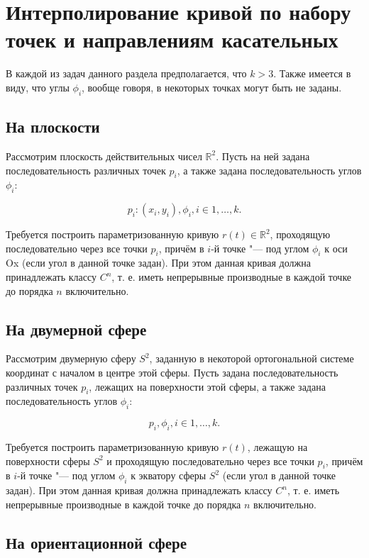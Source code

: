 \section{Интерполирование кривой по набору точек и направлениям касательных}

В каждой из задач данного раздела предполагается, что $k>3$. Также имеется в виду, что углы $\phi_i$, вообще говоря,
в некоторых точках могут быть не заданы.

\subsection*{На плоскости}

Рассмотрим плоскость действительных чисел $\mathbb{R}^2$. Пусть на ней задана последовательность различных точек
$p_i$, а также задана последовательность углов $\phi_i$:

$${p_i: (x_i, y_i)}, {\phi_i}, i \in {1, \dots, k}.$$

Требуется построить параметризованную кривую $r(t) \in \mathbb{R}^2$, проходящую последовательно через все точки
$p_i$, причём в $i$-й точке "--- под углом $\phi_i$ к оси Ox (если угол в данной точке задан). При этом данная кривая
должна принадлежать классу $C^n$, т. е. иметь непрерывные производные в каждой точке до порядка $n$ включительно.

\subsection*{На двумерной сфере}

Рассмотрим двумерную сферу $S^2$, заданную в некоторой ортогональной системе координат с началом в центре этой сферы.
Пусть задана последовательность различных точек $p_i$, лежащих на поверхности этой сферы, а также задана
последовательность углов $\phi_i$:

$${p_i}, {\phi_i}, i \in {1, \dots, k}.$$

Требуется построить параметризованную кривую $r(t)$, лежащую на поверхности сферы $S^2$ и проходящую последовательно
через все точки $p_i$, причём в $i$-й точке "--- под углом $\phi_i$ к экватору сферы $S^2$ (если угол в данной точке
задан). При этом данная кривая должна принадлежать классу $C^n$, т. е. иметь непрерывные производные в каждой точке
до порядка $n$ включительно.

\subsection*{На ориентационной сфере}

